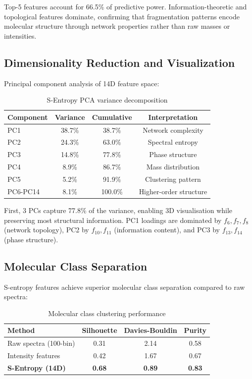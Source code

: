 \documentclass[twocolumn,10pt,a4paper]{article}
\theoremstyle{definition}
\theoremstyle{remark}
\begin{document}
Top-5 features account for 66.5\% of predictive power. Information-theoretic and topological features dominate, confirming that fragmentation patterns encode molecular structure through network properties rather than raw masses or intensities.

\subsection{Dimensionality Reduction and Visualization}

Principal component analysis of 14D feature space:

\begin{table}[h]
\centering
\caption{S-Entropy PCA variance decomposition}
\label{tab:pca_variance}
\begin{tabular}{lccc}
\toprule
\textbf{Component} & \textbf{Variance} & \textbf{Cumulative} & \textbf{Interpretation} \\
\midrule
PC1 & 38.7\% & 38.7\% & Network complexity \\
PC2 & 24.3\% & 63.0\% & Spectral entropy \\
PC3 & 14.8\% & 77.8\% & Phase structure \\
PC4 & 8.9\% & 86.7\% & Mass distribution \\
PC5 & 5.2\% & 91.9\% & Clustering pattern \\
\midrule
PC6-PC14 & 8.1\% & 100.0\% & Higher-order structure \\
\bottomrule
\end{tabular}
\end{table}

First, 3 PCs capture 77.8\% of the variance, enabling 3D visualisation while preserving most structural information. PC1 loadings are dominated by $f_6, f_7, f_8$ (network topology), PC2 by $f_{10}, f_{11}$ (information content), and PC3 by $f_{13}, f_{14}$ (phase structure).

\subsection{Molecular Class Separation}

S-entropy features achieve superior molecular class separation compared to raw spectra:

\begin{table}[h]
\centering
\caption{Molecular class clustering performance}
\label{tab:class_clustering}
\begin{tabular}{lccc}
\toprule
\textbf{Method} & \textbf{Silhouette} & \textbf{Davies-Bouldin} & \textbf{Purity} \\
\midrule
Raw spectra (100-bin) & 0.31 & 2.14 & 0.58 \\
Intensity features & 0.42 & 1.67 & 0.67 \\
\textbf{S-Entropy (14D)} & \textbf{0.68} & \textbf{0.89} & \textbf{0.83} \\
\bottomrule
\end{tabular}
\end{table}
\end{document}
